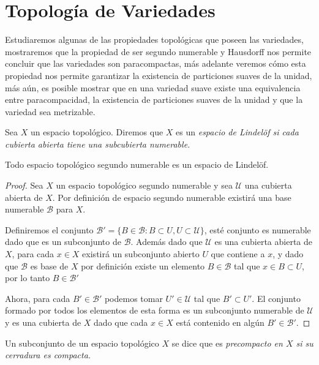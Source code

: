 \appendix
\chapter{Topología de Variedades}\label{Anexo: Topologia De Variedades}
Estudiaremos algunas de las propiedades topológicas que poseen las variedades, mostraremos que la propiedad de ser segundo numerable y Hausdorff nos permite concluir que las variedades son paracompactas, más adelante veremos cómo esta propiedad nos permite garantizar la existencia de particiones suaves de la unidad, más aún, es posible mostrar que en una variedad suave existe una equivalencia entre paracompacidad, la existencia de particiones suaves de la unidad y que la variedad sea metrizable.

\begin{definition}\label{Definición: Lindelöf}
  Sea $X$ un espacio topológico. Diremos que $X$ es un \it{espacio de Lindelöf} si cada cubierta abierta tiene una subcubierta numerable.
\end{definition}

\begin{theorem}
  Todo espacio topológico segundo numerable es un espacio de Lindelöf.
\end{theorem}

\begin{proof}
  Sea $X$ un espacio topológico segundo numerable y sea $\mathcal{U}$ una cubierta abierta de $X$. Por definición de espacio segundo numerable existirá una base numerable $\mathcal{B}$ para $X$.

  Definiremos el conjunto $\mathcal{B}' = \{B \in \mathcal{B} : B \subset U, U \subset \mathcal{U}\}$, esté conjunto es numerable dado que es un subconjunto de $\mathcal{B}$. Además dado que $\mathcal{U}$ es una cubierta abierta de $X$, para cada $x \in X$ existirá un subconjunto abierto $U$ que contiene a $x$, y dado que $\mathcal{B}$ es base de $X$ por definición existe un elemento $B \in \mathcal{B}$ tal que $x \in B \subset U$, por lo tanto $B \in \mathcal{B}'$

  Ahora, para cada $B' \in \mathcal{B}'$ podemos tomar $U' \in \mathcal{U}$ tal que $B' \subset U'$. El conjunto formado por todos los elementos de esta forma es un subconjunto numerable de $\mathcal{U}$ y es una cubierta de $X$ dado que cada $x \in X$ está contenido en algún $B' \in \mathcal{B}'$.
\end{proof}

\begin{definition}\label{Definición: Subconjunto Precompacto}
  Un subconjunto de un espacio topológico $X$ se dice que es \it{precompacto} en $X$ si su cerradura es compacta. 
\end{definition} 


